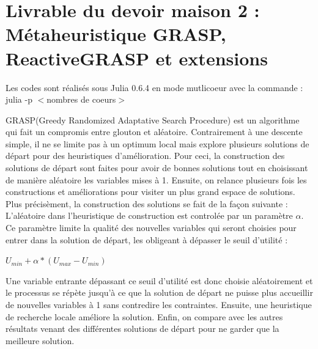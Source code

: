 
\section*{Livrable du devoir maison 2 : \\ Métaheuristique GRASP, ReactiveGRASP et extensions}

Les codes sont réalisés sous Julia 0.6.4 en mode mutlicoeur avec la commande : julia -p $<$nombres de coeurs$>$

\vspace{5mm}
\noindent
{}
\vspace{2mm}


GRASP(Greedy Randomized Adaptative Search Procedure) est un algorithme qui fait un compromis entre
glouton et aléatoire. Contrairement à une descente simple, il ne se limite pas à un optimum local mais explore plusieurs solutions de départ pour des heuristiques d'amélioration. Pour ceci, la construction des solutions de départ sont faites pour avoir de bonnes solutions tout en choisissant de manière aléatoire les variables mises à 1. Ensuite, on relance plusieurs fois les constructions et améliorations pour visiter un plus grand espace de solutions.
Plus précisèment, la construction des solutions se fait de la façon suivante :\\
L'aléatoire dans l'heuristique de construction est controlée par un paramètre $\alpha$.
Ce paramètre limite la qualité des nouvelles variables qui seront choisies pour entrer dans
la solution de départ, les obligeant à dépasser le seuil d'utilité :
\begin{center} $U_{min} + \alpha * (U_{max} - U_{min})$\end{center}
Une variable entrante dépassant ce seuil d'utilité est donc choisie aléatoirement et le processus
se répète jusqu'à ce que la solution de départ ne puisse plus accueillir de nouvelles variables
à 1 sans contredire les contraintes. Ensuite, une heuristique de recherche locale améliore
la solution. Enfin, on compare avec les autres résultats venant des différentes solutions de départ
pour ne garder que la meilleure solution.




